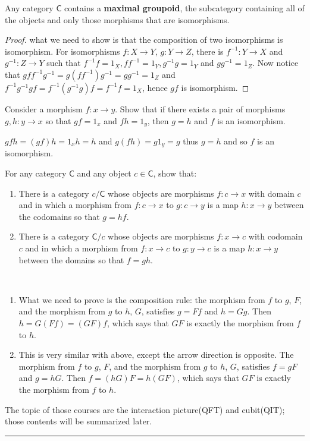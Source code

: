 \begin{lemma} Any category $\mathsf{C}$ contains a \textbf{maximal groupoid}, the subcategory containing all of the objects and only those morphisms that are isomorphisms.
\end{lemma}
\begin{proof} what we need to show is that the composition of two isomorphisms is isomorphism. For isomorphisms $f:X\rightarrow Y$, $g:Y\rightarrow Z$, there is $f^{-1}:Y\rightarrow X$ and $g^{-1}:Z\rightarrow Y$ such that $f^{-1}f=1_X, ff^{-1}=1_Y, g^{-1}g=1_Y$ and $gg^{-1}=1_Z$. Now notice that $gff^{-1}g^{-1}=g(ff^{-1})g^{-1}=gg^{-1}=1_Z$ and $f^{-1}g^{-1}gf=f^{-1}(g^{-1}g)f=f^{-1}f=1_X$, hence $gf$ is isomorphism.
\end{proof}

\begin{exer} Consider a morphism $f:x\rightarrow y$. Show that if there exists a pair of morphisms $g,h:y\rightarrow x$ so that $gf=1_x$ and $fh=1_y$, then $g=h$ and $f$ is an isomorphism.
\end{exer}
\begin{solution}
$gfh=(gf)h=1_x h=h$ and $g(fh)=g1_y=g$ thus $g=h$ and so $f$ is an isomorphism.
\end{solution}

\begin{exer} For any category $\mathsf{C}$ and any object $c\in \mathsf{C}$, show that:
\begin{enumerate}
\item There is a category $c/\mathsf{C}$ whose objects are morphisms $f:c\rightarrow x$ with domain $c$ and in which a morphism from $f:c\rightarrow x$ to $g:c\rightarrow y$ is a map $h:x\rightarrow y$ between the codomains so that $g=hf$.
\item There is a category $\mathsf{C}/c$ whose objects are morphisms $f:x\rightarrow c$ with codomain $c$ and in which a morphism from $f:x\rightarrow c$ to $g:y\rightarrow c$ is a map $h:x\rightarrow y$ between the domains so that $f=gh$.
\end{enumerate}
\end{exer}
\begin{solution}
~\begin{enumerate}
\item What we need to prove is the composition rule: the morphism from $f$ to $g$, $F$, and the morphism from $g$ to $h$, $G$, satisfies $g=Ff$ and $h=Gg$. Then $h=G(Ff)=(GF)f$, which says that $GF$ is exactly the morphism from $f$ to $h$.
\item This is very similar with above, except the arrow direction is opposite. The morphism from $f$ to $g$, $F$, and the morphism from $g$ to $h$, $G$, satisfies $f=gF$ and $g=hG$. Then $f=(hG)F=h(GF)$, which says that $GF$ is exactly the morphism from $f$ to $h$.
\end{enumerate}
\end{solution}
\bigbreak
{}
The topic of those courses are the interaction picture(QFT) and cubit(QIT); those contents will be summarized later.

\noindent\rule{\textwidth}{1pt}
\newline